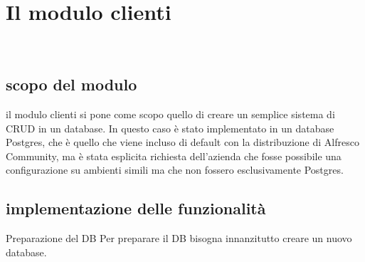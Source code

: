 %
%
%
%
%
%
%
%
%
%
%
%
%
\chapter{Il modulo clienti}
\label{cap:modulo-clienti}

\\

\section{scopo del modulo} il modulo clienti si pone come scopo quello di creare un semplice sistema di CRUD in un database. In questo caso è stato implementato in un database Postgres, che è quello che viene incluso di default con la distribuzione di Alfresco Community, ma è stata esplicita richiesta dell'azienda che fosse possibile una configurazione su ambienti simili ma che non fossero esclusivamente Postgres.
\section{implementazione delle funzionalità}
Preparazione del DB
Per preparare il DB bisogna innanzitutto creare un nuovo database.

